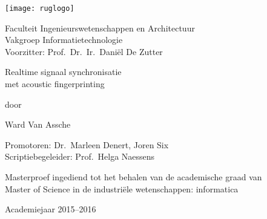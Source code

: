 

\begin{titlepage}

\setlength{\hoffset}{-1in}
\setlength{\voffset}{-1in}
\setlength{\topmargin}{1.5cm}
\setlength{\headheight}{0.5cm}
\setlength{\headsep}{1cm}
\setlength{\oddsidemargin}{3cm}
\setlength{\evensidemargin}{3cm}
\setlength{\footskip}{1.5cm}
\enlargethispage{1cm}

\fontsize{12pt}{14pt}
\selectfont

\begin{center}

\texttt{[image: ruglogo]}

\vspace{0.5cm}

Faculteit Ingenieurswetenschappen en Architectuur\\
Vakgroep Informatietechnologie\\
Voorzitter: Prof.~Dr.~Ir.~Daniël De Zutter

\vspace{3cm}

\fontsize{17.28pt}{21pt}
\selectfont

Realtime signaal synchronisatie \\
met acoustic fingerprinting

\fontsize{12pt}{14pt}
\selectfont

\vspace{.6cm}

door 

\vspace{.4cm}

Ward Van Assche

\vspace{2.5cm}

Promotoren: Dr.~Marleen Denert, Joren Six\\
Scriptiebegeleider: Prof.~Helga Naessens\\

\vspace{2cm}

Masterproef ingediend tot het behalen van de academische graad van\\
Master of Science in de industriële wetenschappen: informatica

\vspace{0.5cm}

Academiejaar 2015--2016

\end{center}
\end{titlepage}
